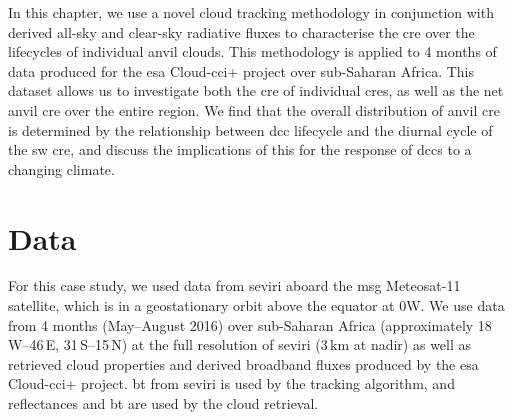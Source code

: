 
In this chapter, we use a novel cloud tracking methodology in conjunction with derived all-sky and clear-sky radiative fluxes to characterise the \acrshort{cre} over the lifecycles of individual anvil clouds. 
This methodology is applied to 4 months of data produced for the \acrshort{esa} Cloud-\acrfull{cci}+ project over sub-Saharan Africa. 
This dataset allows us to investigate both the \acrshort{cre} of individual \acrshort{cre}s, as well as the net anvil \acrshort{cre} over the entire region. 
We find that the overall distribution of anvil \acrshort{cre} is determined by the relationship between \acrshort{dcc} lifecycle and the diurnal cycle of the \acrshort{sw} \acrshort{cre}, and discuss the implications of this for the response of \acrshort{dcc}s to a changing climate.



\section{Data}

For this case study, we used data from \acrshort{seviri} \citep{aminou_msg_2002} aboard the \acrfull{msg} Meteosat-11 satellite, which is in a geostationary orbit above the equator at 0\textdegree W. 
We use data from 4 months (May--August 2016) over sub-Saharan Africa (approximately 18\,\textdegree W--46\,\textdegree E, 31\,\textdegree S--15\,\textdegree N) at the full resolution of \acrshort{seviri} (3\,\unit{km} at nadir) as well as retrieved cloud properties and derived broadband fluxes produced by the \acrshort{esa} Cloud-\acrshort{cci}+ project.
\acrshort{bt} from \acrshort{seviri} is used by the tracking algorithm, and reflectances and \acrshort{bt} are used by the cloud retrieval.

